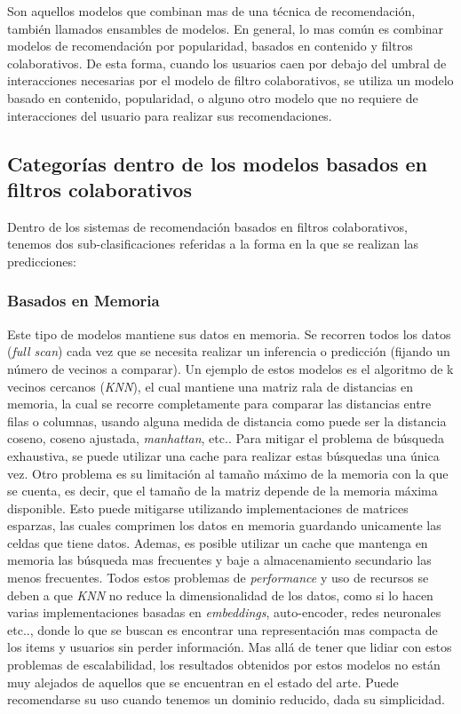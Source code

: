 \documentclass[11pt,a4paper,twoside]{thesis}
\begin{document}
Son aquellos modelos que combinan mas de una técnica de recomendación, también llamados ensambles de modelos. En general, lo mas común es combinar modelos de recomendación por popularidad, basados en contenido y filtros colaborativos. De esta forma, cuando los usuarios caen por debajo del umbral de interacciones necesarias por el modelo de filtro colaborativos, se utiliza un modelo basado en contenido, popularidad, o alguno otro modelo que no requiere de interacciones del usuario para realizar sus recomendaciones.

\subsection{Categorías dentro de los modelos basados en filtros colaborativos} 

Dentro de los sistemas de recomendación basados en filtros colaborativos, tenemos dos sub-clasificaciones referidas a la forma en la que se realizan las predicciones:

 \subsubsection{Basados en Memoria} 
 
 Este tipo de modelos mantiene sus datos en memoria. Se recorren todos los datos (\textit{full scan}) cada vez que se necesita realizar un inferencia o predicción (fijando un número de vecinos a comparar). Un ejemplo de estos modelos es el algoritmo de k vecinos cercanos (\textit{KNN}), el cual mantiene una matriz rala de distancias en memoria, la cual se recorre completamente para comparar las distancias entre filas o columnas, usando alguna medida de distancia como puede ser la distancia coseno, coseno ajustada, \textit{manhattan}, etc..
 Para mitigar el problema de búsqueda exhaustiva, se puede utilizar una cache para realizar estas búsquedas una única vez. Otro problema es su limitación al tamaño máximo de la memoria con la que se cuenta, es decir, que el tamaño de la matriz depende de la memoria máxima disponible. Esto puede mitigarse utilizando implementaciones de matrices esparzas, las cuales comprimen los datos en memoria guardando unicamente las celdas que tiene datos. Ademas, es posible utilizar un cache que mantenga en memoria las búsqueda mas frecuentes y baje a almacenamiento secundario las menos frecuentes. Todos estos problemas de \textit{performance} y uso de recursos se deben a que \textit{KNN} no reduce la dimensionalidad de los datos, como si lo hacen varias implementaciones basadas en \textit{embeddings}, auto-encoder, redes neuronales etc.., donde lo que se buscan es encontrar una representación mas compacta de los items y usuarios sin perder información. Mas allá de tener que lidiar con estos problemas de escalabilidad, los resultados obtenidos por estos modelos no están muy alejados de aquellos que se encuentran en el estado del arte. Puede recomendarse su uso cuando tenemos un dominio reducido, dada su simplicidad. 
\end{document}
